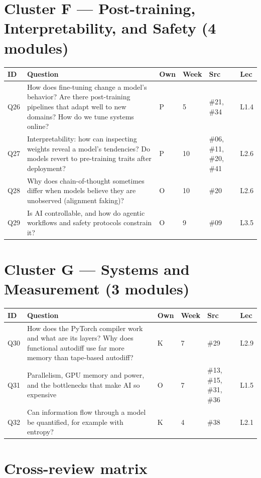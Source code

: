 \documentclass[11pt,letterpaper]{article}
\begin{document}
\section*{Cluster F --- Post-training, Interpretability, and Safety (4 modules)}

\begin{longtable}{C{1.1cm} Q C{0.8cm} C{1.0cm} C{1.5cm} C{1.5cm}}
\toprule
\textbf{ID} & \textbf{Question} & \textbf{Own} & \textbf{Week} & \textbf{Src} & \textbf{Lec} \\
\midrule
Q26 & How does fine-tuning change a model's behavior? Are there post-training pipelines that adapt well to new domains? How do we tune systems online? & P & 5 & \#21, \#34 & L1.4 \\
Q27 & Interpretability: how can inspecting weights reveal a model's tendencies? Do models revert to pre-training traits after deployment? & P & 10 & \#06, \#11, \#20, \#41 & L2.6 \\
Q28 & Why does chain-of-thought sometimes differ when models believe they are unobserved (alignment faking)? & O & 10 & \#20 & L2.6 \\
Q29 & Is AI controllable, and how do agentic workflows and safety protocols constrain it? & O & 9 & \#09 & L3.5 \\
\bottomrule
\end{longtable}

\section*{Cluster G --- Systems and Measurement (3 modules)}

\begin{longtable}{C{1.1cm} Q C{0.8cm} C{1.0cm} C{1.5cm} C{1.5cm}}
\toprule
\textbf{ID} & \textbf{Question} & \textbf{Own} & \textbf{Week} & \textbf{Src} & \textbf{Lec} \\
\midrule
Q30 & How does the PyTorch compiler work and what are its layers? Why does functional autodiff use far more memory than tape-based autodiff? & K & 7 & \#29 & L2.9 \\
Q31 & Parallelism, GPU memory and power, and the bottlenecks that make AI so expensive & O & 7 & \#13, \#15, \#31, \#36 & L1.5 \\
Q32 & Can information flow through a model be quantified, for example with entropy? & K & 4 & \#38 & L2.1 \\
\bottomrule
\end{longtable}

\section*{Cross-review matrix}
\end{document}
